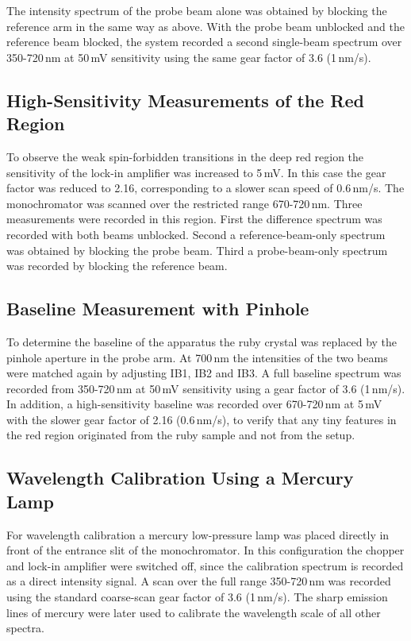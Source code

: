 \documentclass[a4paper]{article}
\begin{document}
The intensity spectrum of the probe beam alone was obtained by blocking the reference arm in the same way as above.
With the probe beam unblocked and the reference beam blocked, the system recorded a second single-beam spectrum over 350-720\,nm at 50\,mV sensitivity using the same gear factor of 3.6 (1\,nm/s).

\subsection{High-Sensitivity Measurements of the Red Region}

To observe the weak spin-forbidden transitions in the deep red region the sensitivity of the lock-in amplifier was increased to 5\,mV.
In this case the gear factor was reduced to 2.16, corresponding to a slower scan speed of 0.6\,nm/s.
The monochromator was scanned over the restricted range 670-720\,nm.
Three measurements were recorded in this region.
First the difference spectrum was recorded with both beams unblocked.
Second a reference-beam-only spectrum was obtained by blocking the probe beam.
Third a probe-beam-only spectrum was recorded by blocking the reference beam.

\subsection{Baseline Measurement with Pinhole}

To determine the baseline of the apparatus the ruby crystal was replaced by the pinhole aperture in the probe arm.
At 700\,nm the intensities of the two beams were matched again by adjusting IB1, IB2 and IB3.
A full baseline spectrum was recorded from 350-720\,nm at 50\,mV sensitivity using a gear factor of 3.6 (1\,nm/s).
In addition, a high-sensitivity baseline was recorded over 670-720\,nm at 5\,mV with the slower gear factor of 2.16 (0.6\,nm/s), to verify that any tiny features in the red region originated from the ruby sample and not from the setup.

\subsection{Wavelength Calibration Using a Mercury Lamp}

For wavelength calibration a mercury low-pressure lamp was placed directly in front of the entrance slit of the monochromator.
In this configuration the chopper and lock-in amplifier were switched off, since the calibration spectrum is recorded as a direct intensity signal.
A scan over the full range 350-720\,nm was recorded using the standard coarse-scan gear factor of 3.6 (1\,nm/s).
The sharp emission lines of mercury were later used to calibrate the wavelength scale of all other spectra.
\end{document}
